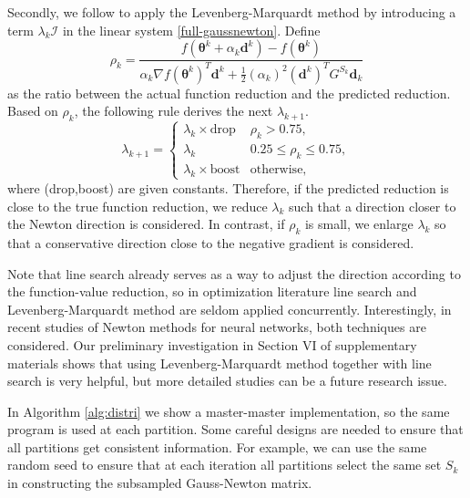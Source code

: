 \documentclass[12pt]{article}
\def\bd{{\boldsymbol d}}
\def\btheta{\boldsymbol \theta}
\renewcommand{\baselinestretch}{2}
\begin{document}
Secondly, we follow \cite{JM10a,JM12a,CCW15a} to apply the Levenberg-Marquardt method by introducing a term $\lambda_k \mathcal{I}$
in the linear system \eqref{full-gaussnewton}. Define
\begin{equation*}
  \rho_k = \frac{f(\btheta^k + \alpha_k \bd^k) - f(\btheta^k)}{\alpha_k \nabla f(\btheta^k)^T \bd^k + \frac{1}{2} (\alpha_k)^2 (\bd^k)^T G^{S_k} \bd_k}
\end{equation*} 
as the ratio between the actual function reduction and the predicted reduction. Based on $\rho_k$, the following rule
derives the next $\lambda_{k+1}$. 
\begin{equation}
\label{LM-rules}
\lambda_{k+1} =
\begin{cases}
\lambda_k \times \text{drop}& \rho_k > 0.75, \\
\lambda_k & 0.25 \leq \rho_k \leq 0.75, \\
\lambda_k \times \text{boost}& \text{otherwise,}
\end{cases}
\end{equation}
where (drop,boost) are given constants. 
Therefore, if the predicted reduction is close to the true function reduction, we reduce $\lambda_k$ such that
a direction closer to the Newton direction is considered. In contrast, if $\rho_k$ is small, we enlarge $\lambda_k$
so that a conservative direction close to the negative gradient is considered.
\par Note that line search already serves as a way to adjust the direction according to the function-value
reduction, so in optimization literature line search and Levenberg-Marquardt method are seldom applied concurrently.
Interestingly, in recent studies of Newton methods for neural networks, both techniques are considered. Our preliminary investigation in Section VI of supplementary materials shows that using Levenberg-Marquardt method together with line search is very helpful, but more detailed studies can be a future research issue.
\par In Algorithm \ref{alg:distri} we show a master-master implementation, so
the same program is used at each partition. Some
careful designs are needed to ensure that all partitions
get consistent information. For example, we can use the
same random seed to ensure that at each iteration all 
partitions select the same set $S_k$ in constructing the subsampled Gauss-Newton matrix.
\renewcommand{\baselinestretch}{1.3}
\end{document}
